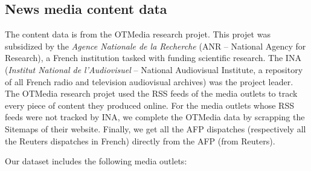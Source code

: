 \subsection{News media content data\label{Sec:OA_Content}}

The content data is from the OTMedia research projet. This projet was subsidized by the \textit{Agence Nationale de la Recherche} (ANR -- National Agency for Research), a French institution tasked with funding scientific research. The INA (\textit{Institut National de l'Audiovisuel} -- National Audiovisual Institute, a repository of all French radio and television audiovisual archives) was the project leader. The OTMedia research projet used the RSS feeds of the media outlets to track every piece of content they produced online. For the media outlets whose RSS feeds were not tracked by INA, we complete the OTMedia data by scrapping the Sitemaps of their website. Finally, we get all the AFP dispatches (respectively all the Reuters dispatches in French) directly from the AFP (from Reuters).

Our dataset includes the following media outlets:

